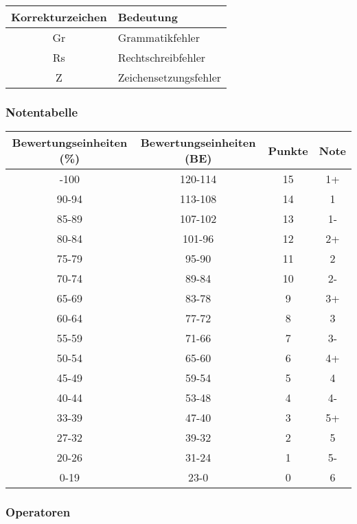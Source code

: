 \documentclass[
  11pt,
  a4paper,
  DIV=11,
  numbers=noendperiod]{scrartcl}
\begin{document}
\begin{longtable}[]{@{}cl@{}}
\toprule\noalign{}
Korrekturzeichen & Bedeutung \\
\midrule\noalign{}
\endhead
\bottomrule\noalign{}
\endlastfoot
Gr & Grammatikfehler \\
Rs & Rechtschreibfehler \\
Z & Zeichensetzungsfehler \\
\end{longtable}

\subsubsection{Notentabelle}\label{notentabelle}

\begin{longtable}[]{@{}cccc@{}}
\toprule\noalign{}
Bewertungseinheiten (\%) & Bewertungseinheiten (BE) & Punkte & Note \\
\midrule\noalign{}
\endhead
\bottomrule\noalign{}
\endlastfoot
95-100 & 120-114 & 15 & 1+ \\
90-94 & 113-108 & 14 & 1 \\
85-89 & 107-102 & 13 & 1- \\
80-84 & 101-96 & 12 & 2+ \\
75-79 & 95-90 & 11 & 2 \\
70-74 & 89-84 & 10 & 2- \\
65-69 & 83-78 & 9 & 3+ \\
60-64 & 77-72 & 8 & 3 \\
55-59 & 71-66 & 7 & 3- \\
50-54 & 65-60 & 6 & 4+ \\
45-49 & 59-54 & 5 & 4 \\
40-44 & 53-48 & 4 & 4- \\
33-39 & 47-40 & 3 & 5+ \\
27-32 & 39-32 & 2 & 5 \\
20-26 & 31-24 & 1 & 5- \\
0-19 & 23-0 & 0 & 6 \\
\end{longtable}

\subsubsection{Operatoren}\label{operatoren}
\end{document}

